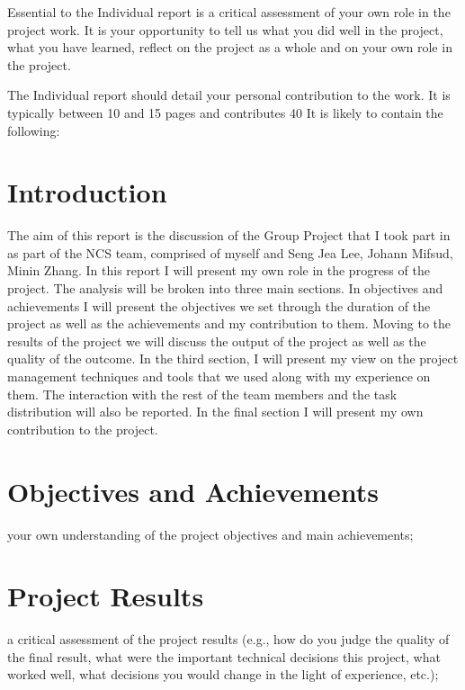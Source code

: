 






\tableofcontents{}

Essential to the Individual report is a critical assessment of your own role in
the project work. It is your opportunity to tell us what you did well in the
project, what you have learned, reflect on the project as a whole and on your
own role in the project.

The Individual report should detail your personal contribution to the work. It
is typically between 10 and 15 pages and contributes 40%
It is likely to contain the following:

\section{Introduction}
The aim of this report is the discussion of the Group Project that I took part
in as part of the NCS team, comprised of myself and Seng Jea Lee, Johann Mifsud,
Minin Zhang. In this report I will present my own role in the progress of
the project. The analysis will be broken into three main sections. In objectives
and achievements I will present the objectives we set through the duration of
the project as well as the achievements and my contribution to them. Moving to
the results of the project we will discuss the output of the project as well as
the quality of the outcome. In the third section, I will present my view on the
project management techniques and tools that we used along with my experience on
them. The interaction with the rest of the team members and the task
distribution will also be reported. In the final section I will present my own
contribution to the project.

\section{Objectives and Achievements}


    your own understanding of the project objectives and main achievements;

\section{Project Results}
    a critical assessment of the project results (e.g., how do you judge the
    quality of the final result, what were the important technical decisions
    this project, what worked well, what decisions you would change in the light
    of experience, etc.);

